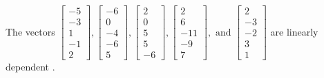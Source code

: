 \begin{exercise}
\begin{exerciseStatement}
  \end{exerciseStatement}
  \begin{exerciseAnswer}
   The vectors \(\left[\begin{array}{r}
-5 \\
-3 \\
1 \\
-1 \\
2
\end{array}\right] , \left[\begin{array}{r}
-6 \\
0 \\
-4 \\
-6 \\
5
\end{array}\right] , \left[\begin{array}{r}
2 \\
0 \\
5 \\
5 \\
-6
\end{array}\right] , \left[\begin{array}{r}
2 \\
6 \\
-11 \\
-9 \\
7
\end{array}\right] , \text{ and } \left[\begin{array}{r}
2 \\
-3 \\
-2 \\
3 \\
1
\end{array}\right]\) are 
  	 linearly dependent  .
  


  \end{exerciseAnswer}
\end{exercise}